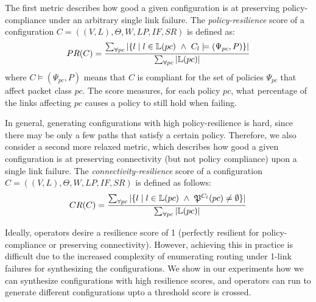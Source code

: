 The first metric describes how good a given configuration
is at preserving policy-compliance under an 
arbitrary single link failure. 
The \emph{policy-resilience} score of a configuration 
$C=((V,L), \Theta,W,LP,IF,SR)$
is defined as:
\[
PR(C)=\frac{\sum_{\forall pc} |\{ l \mid l \in \mathbb{L}(pc) ~\wedge~ C_l \models (\Psi_{pc}, P) \}|}
{\sum_{\forall pc} |\mathbb{L}(pc)|}
\]
where $C \models (\Psi_{pc}, P)$ means that $C$ is 
compliant for the set of policies $\Psi_{pc}$ that affect packet class $pc$.
The score measures, for each policy $pc$, what percentage of the links affecting $pc$
causes a policy to still hold when failing.

In general, generating configurations with high policy-resilience is hard,
since there may be only a few paths that satisfy a certain policy.
Therefore, we also consider a second 
more relaxed metric, which describes how 
good a given configuration
is at preserving connectivity
(but not policy compliance) upon a single link failure. 
The \emph{connectivity-resilience} 
score of a configuration $C=((V,L), \Theta,W,LP,IF,SR)$
is defined as follows:
\[
CR(C)=\frac{\sum_{\forall pc} |\{ l \mid l \in \mathbb{L}(pc) ~\wedge~\mathfrak{P}^{C_l }(pc) \not= \emptyset  \}|}
{\sum_{\forall pc} |\mathbb{L}(pc)|}
\]
 
Ideally, operators desire a resilience score of 1 (perfectly resilient for policy-compliance or
preserving connectivity). However, achieving this in practice is difficult due to the 
increased complexity of enumerating routing under 1-link failures for synthesizing 
the configurations. We show in our experiments how we can synthesize configurations 
with high resilience scores, and operators can run \name to generate different configurations upto 
a threshold score is crossed. 

